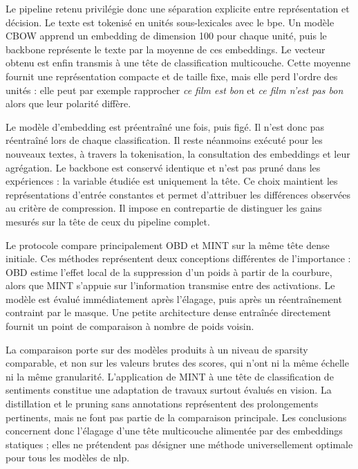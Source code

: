 Le pipeline retenu privilégie donc une séparation explicite entre
représentation et décision. Le texte est tokenisé en unités sous-lexicales avec
le \gls{bpe}. Un modèle CBOW apprend un embedding de dimension 100 pour chaque
unité, puis le backbone représente le texte par la moyenne de ces embeddings.
Le vecteur obtenu est enfin transmis à une tête de classification multicouche.
Cette moyenne fournit une représentation compacte et de taille fixe, mais elle
perd l'ordre des unités : elle peut par exemple rapprocher \emph{ce film est
bon} et \emph{ce film n'est pas bon} alors que leur polarité diffère.

Le modèle d'embedding est préentraîné une fois, puis figé. Il n'est donc pas
réentraîné lors de chaque classification. Il reste néanmoins exécuté pour les
nouveaux textes, à travers la tokenisation, la consultation des embeddings et
leur agrégation. Le backbone est conservé identique et n'est pas pruné dans les
expériences : la variable étudiée est uniquement la tête. Ce choix maintient les
représentations d'entrée constantes et permet d'attribuer les différences
observées au critère de compression. Il impose en contrepartie de distinguer les
gains mesurés sur la tête de ceux du pipeline complet.

Le protocole compare principalement OBD et MINT sur la même tête dense initiale.
Ces méthodes représentent deux conceptions différentes de l'importance : OBD
estime l'effet local de la suppression d'un poids à partir de la courbure, alors
que MINT s'appuie sur l'information transmise entre des activations. Le modèle
est évalué immédiatement après l'élagage, puis après un réentraînement contraint
par le masque. Une petite architecture dense entraînée directement fournit un
point de comparaison à nombre de poids voisin.

La comparaison porte sur des modèles produits à un niveau de \gls{sparsity}
comparable, et non sur les valeurs brutes des scores, qui n'ont ni la même
échelle ni la même granularité. L'application de MINT à une tête de
classification de sentiments constitue une adaptation de travaux surtout
évalués en vision. La distillation et le pruning sans annotations représentent
des prolongements pertinents, mais ne font pas partie de la comparaison
principale. Les conclusions concernent donc l'élagage d'une tête multicouche
alimentée par des embeddings statiques ; elles ne prétendent pas désigner une
méthode universellement optimale pour tous les modèles de \gls{nlp}.

